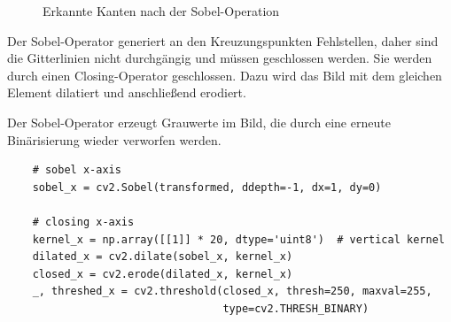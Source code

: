 \begin{figure}[H]
    \hfill
    \caption{Erkannte Kanten nach der Sobel-Operation}
\end{figure}

Der Sobel-Operator generiert an den Kreuzungspunkten Fehlstellen, daher sind die Gitterlinien nicht durchgängig und müssen geschlossen werden.
Sie werden durch einen Closing-Operator geschlossen.
Dazu wird das Bild mit dem gleichen Element dilatiert und anschließend erodiert.

Der Sobel-Operator erzeugt Grauwerte im Bild, die durch eine erneute Binärisierung wieder verworfen werden.

\begin{lstlisting}
    # sobel x-axis
    sobel_x = cv2.Sobel(transformed, ddepth=-1, dx=1, dy=0)

    # closing x-axis
    kernel_x = np.array([[1]] * 20, dtype='uint8')  # vertical kernel
    dilated_x = cv2.dilate(sobel_x, kernel_x)
    closed_x = cv2.erode(dilated_x, kernel_x)
    _, threshed_x = cv2.threshold(closed_x, thresh=250, maxval=255,
                                  type=cv2.THRESH_BINARY)
\end{lstlisting}

